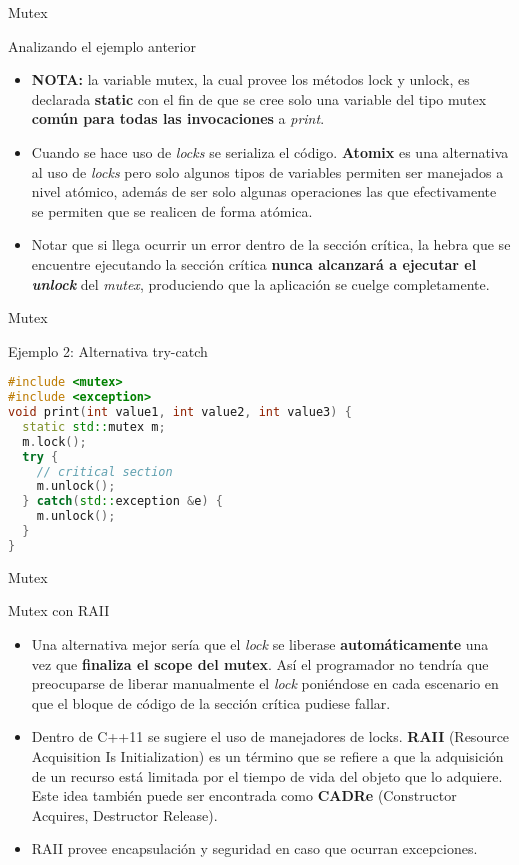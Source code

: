\begin{frame}{Mutex}
\begin{block}{Analizando el ejemplo anterior}
\begin{itemize}
  \item \textbf{NOTA:} la variable mutex, la cual provee los métodos lock y unlock, es declarada \textbf{static} con el fin de que se cree solo una variable del tipo mutex \textbf{común para todas las invocaciones} a \textit{print}.
  \item Cuando se hace uso de \textit{locks} se serializa el código. \textbf{Atomix} es una alternativa al uso de \textit{locks} pero solo algunos tipos de variables permiten ser manejados a nivel atómico, además de ser solo algunas operaciones las que efectivamente se permiten que se realicen de forma atómica.
  \item Notar que si llega ocurrir un error dentro de la sección crítica, la hebra que se encuentre ejecutando la sección crítica \textbf{nunca alcanzará a ejecutar el \textit{unlock}} del \textit{mutex}, produciendo que la aplicación se cuelge completamente.
\end{itemize}
\end{block}
\end{frame}

\begin{frame}[fragile]{Mutex}
\begin{block}{Ejemplo 2: Alternativa try-catch}
\begin{lstlisting}[language=C++, basicstyle=\small]
#include <mutex>
#include <exception>
void print(int value1, int value2, int value3) {
  static std::mutex m;
  m.lock();
  try {
    // critical section
    m.unlock();
  } catch(std::exception &e) {
    m.unlock();
  }
}
\end{lstlisting}
\end{block}
\end{frame}

\begin{frame}{Mutex}
\begin{block}{Mutex con RAII}
\begin{itemize}
  \item Una alternativa mejor sería que el \textit{lock} se liberase \textbf{automáticamente} una vez que \textbf{finaliza el scope del mutex}. Así el programador no tendría que preocuparse de liberar manualmente el \textit{lock} poniéndose en cada escenario en que el bloque de código de la sección crítica pudiese fallar.
  \item Dentro de C++11 se sugiere el uso de manejadores de locks. \textbf{RAII} (Resource Acquisition Is Initialization) es un término que se refiere a que la adquisición de un recurso está limitada por el tiempo de vida  del objeto que lo adquiere. Este idea también puede ser encontrada como \textbf{CADRe} (Constructor Acquires, Destructor Release).
  \item RAII provee encapsulación y seguridad en caso que ocurran excepciones.
\end{itemize}
\end{block}
\end{frame}


